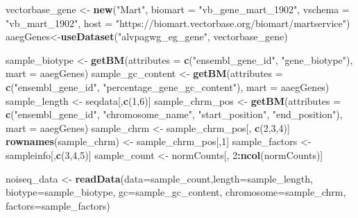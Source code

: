 \documentclass[]{article}
\newenvironment{Shaded}{\begin{snugshade}}{\end{snugshade}}
\newcommand{\KeywordTok}[1]{\textcolor[rgb]{0.13,0.29,0.53}{\textbf{#1}}}
\newcommand{\DataTypeTok}[1]{\textcolor[rgb]{0.13,0.29,0.53}{#1}}
\newcommand{\DecValTok}[1]{\textcolor[rgb]{0.00,0.00,0.81}{#1}}
\newcommand{\StringTok}[1]{\textcolor[rgb]{0.31,0.60,0.02}{#1}}
\newcommand{\OperatorTok}[1]{\textcolor[rgb]{0.81,0.36,0.00}{\textbf{#1}}}
\newcommand{\NormalTok}[1]{#1}
\begin{document}
\begin{Shaded}
\begin{Highlighting}[]
\NormalTok{vectorbase_gene <-}\StringTok{ }\KeywordTok{new}\NormalTok{(}\StringTok{"Mart"}\NormalTok{, }\DataTypeTok{biomart =} \StringTok{"vb_gene_mart_1902"}\NormalTok{, }\DataTypeTok{vschema =} \StringTok{"vb_mart_1902"}\NormalTok{, }\DataTypeTok{host =} \StringTok{"https://biomart.vectorbase.org/biomart/martservice"}\NormalTok{)}
\NormalTok{aaegGenes<-}\KeywordTok{useDataset}\NormalTok{(}\StringTok{"alvpagwg_eg_gene"}\NormalTok{, vectorbase_gene)}

\NormalTok{sample_biotype <-}\StringTok{ }\KeywordTok{getBM}\NormalTok{(}\DataTypeTok{attributes =} \KeywordTok{c}\NormalTok{(}\StringTok{"ensembl_gene_id"}\NormalTok{, }\StringTok{"gene_biotype"}\NormalTok{), }\DataTypeTok{mart =}\NormalTok{ aaegGenes)}
\NormalTok{sample_gc_content <-}\StringTok{ }\KeywordTok{getBM}\NormalTok{(}\DataTypeTok{attributes =} \KeywordTok{c}\NormalTok{(}\StringTok{"ensembl_gene_id"}\NormalTok{, }\StringTok{"percentage_gene_gc_content"}\NormalTok{), }\DataTypeTok{mart =}\NormalTok{ aaegGenes)}
\NormalTok{sample_length <-}\StringTok{ }\NormalTok{seqdata[,}\KeywordTok{c}\NormalTok{(}\DecValTok{1}\NormalTok{,}\DecValTok{6}\NormalTok{)]}
\NormalTok{sample_chrm_pos <-}\StringTok{ }\KeywordTok{getBM}\NormalTok{(}\DataTypeTok{attributes =} \KeywordTok{c}\NormalTok{(}\StringTok{"ensembl_gene_id"}\NormalTok{, }\StringTok{"chromosome_name"}\NormalTok{, }\StringTok{"start_position"}\NormalTok{, }\StringTok{"end_position"}\NormalTok{), }\DataTypeTok{mart =}\NormalTok{ aaegGenes)}
\NormalTok{sample_chrm <-}\StringTok{ }\NormalTok{sample_chrm_pos[, }\KeywordTok{c}\NormalTok{(}\DecValTok{2}\NormalTok{,}\DecValTok{3}\NormalTok{,}\DecValTok{4}\NormalTok{)]}
\KeywordTok{rownames}\NormalTok{(sample_chrm) <-}\StringTok{ }\NormalTok{sample_chrm_pos[,}\DecValTok{1}\NormalTok{]}
\NormalTok{sample_factors <-}\StringTok{ }\NormalTok{sampleinfo[,}\KeywordTok{c}\NormalTok{(}\DecValTok{3}\NormalTok{,}\DecValTok{4}\NormalTok{,}\DecValTok{5}\NormalTok{)]}
\NormalTok{sample_count <-}\StringTok{ }\NormalTok{normCounts[, }\DecValTok{2}\OperatorTok{:}\KeywordTok{ncol}\NormalTok{(normCounts)]}

\NormalTok{noiseq_data <-}\StringTok{ }\KeywordTok{readData}\NormalTok{(}\DataTypeTok{data=}\NormalTok{sample_count,}\DataTypeTok{length=}\NormalTok{sample_length, }\DataTypeTok{biotype=}\NormalTok{sample_biotype, }\DataTypeTok{gc=}\NormalTok{sample_gc_content, }\DataTypeTok{chromosome=}\NormalTok{sample_chrm, }\DataTypeTok{factors=}\NormalTok{sample_factors)}
\end{Highlighting}
\end{Shaded}
\end{document}

